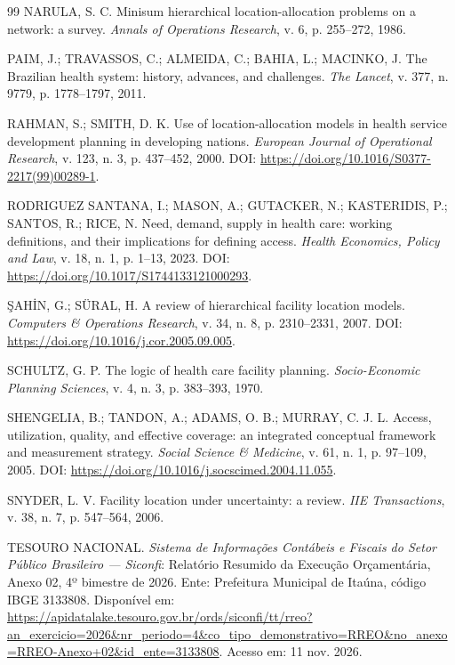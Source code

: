 \documentclass[12pt,a4paper,oneside]{report}
\begin{document}
\begin{thebibliography}{99}
NARULA, S. C. Minisum hierarchical location-allocation problems on a network: a survey. \textit{Annals of Operations Research}, v. 6, p. 255--272, 1986.

PAIM, J.; TRAVASSOS, C.; ALMEIDA, C.; BAHIA, L.; MACINKO, J. The Brazilian health system: history, advances, and challenges. \textit{The Lancet}, v. 377, n. 9779, p. 1778--1797, 2011.

RAHMAN, S.; SMITH, D. K. Use of location-allocation models in health service development planning in developing nations. \textit{European Journal of Operational Research}, v. 123, n. 3, p. 437--452, 2000. DOI: \url{https://doi.org/10.1016/S0377-2217(99)00289-1}.

RODRIGUEZ SANTANA, I.; MASON, A.; GUTACKER, N.; KASTERIDIS, P.; SANTOS, R.; RICE, N. Need, demand, supply in health care: working definitions, and their implications for defining access. \textit{Health Economics, Policy and Law}, v. 18, n. 1, p. 1--13, 2023. DOI: \url{https://doi.org/10.1017/S1744133121000293}.

\c{S}AH\.{I}N, G.; SÜRAL, H. A review of hierarchical facility location models. \textit{Computers \& Operations Research}, v. 34, n. 8, p. 2310--2331, 2007. DOI: \url{https://doi.org/10.1016/j.cor.2005.09.005}.

SCHULTZ, G. P. The logic of health care facility planning. \textit{Socio-Economic Planning Sciences}, v. 4, n. 3, p. 383--393, 1970.

SHENGELIA, B.; TANDON, A.; ADAMS, O. B.; MURRAY, C. J. L. Access, utilization, quality, and effective coverage: an integrated conceptual framework and measurement strategy. \textit{Social Science \& Medicine}, v. 61, n. 1, p. 97--109, 2005. DOI: \url{https://doi.org/10.1016/j.socscimed.2004.11.055}.

SNYDER, L. V. Facility location under uncertainty: a review. \textit{IIE Transactions}, v. 38, n. 7, p. 547--564, 2006.

TESOURO NACIONAL. \textit{Sistema de Informações Contábeis e Fiscais do Setor Público Brasileiro --- Siconfi}: Relatório Resumido da Execução Orçamentária, Anexo 02, 4º bimestre de 2026. Ente: Prefeitura Municipal de Itaúna, código IBGE 3133808. Disponível em: \url{https://apidatalake.tesouro.gov.br/ords/siconfi/tt/rreo?an_exercicio=2026&nr_periodo=4&co_tipo_demonstrativo=RREO&no_anexo=RREO-Anexo+02&id_ente=3133808}. Acesso em: 11 nov. 2026.

\end{thebibliography}


\end{document}
